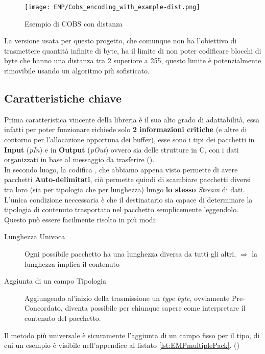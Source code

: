 \begin{figure}[h]
	\centering
	\texttt{[image: EMP/Cobs\_encoding\_with\_example-dist.png]}
	\caption[Esempio di COBS con distanza]{Esempio di COBS con distanza}
\end{figure}

La versione usata per questo progetto, che comunque non ha l'obiettivo di trasmettere quantità infinite di byte, ha il limite di non poter codificare blocchi di byte che hanno una distanza tra 2 \zeroByte superiore a 255, questo limite è potenzialmente rimovibile usando un algoritmo più sofisticato.

\subsection{Caratteristiche chiave}
Prima caratteristica vincente della libreria è il suo alto grado di adattabilità, essa infatti per poter funzionare richiede solo \textbf{2 informazioni critiche} (e altre di contorno per l'allocazione opportuna dei buffer), esse sono i tipi dei pacchetti in \textbf{ Input} (\textit{pIn}) e in \textbf{Output} (\textit{pOut}) ovvero sia delle strutture in C, con i dati organizzati in base al messaggio da trasferire ().\\
In secondo luogo, la codifica , che abbiamo appena visto permette di avere pacchetti \textbf{Auto-delimitati}, ciò permette quindi di scambiare pacchetti diversi tra loro (sia per tipologia che per lunghezza) lungo \textbf{lo stesso} \textit{Stream} di dati.\\
L'unica condizione neccessaria è che il destinatario sia capace di determinare la tipologia di contenuto trasportato nel pacchetto semplicemente leggendolo.\\
Questo può essere facilmente risolto in più modi:
\begin{spacing}{1.5}
	\begin{description}
		\item[Lunghezza Univoca] Ogni possibile pacchetto ha una lunghezza diversa da tutti gli altri, $\Rightarrow$ la lunghezza implica il contenuto
		\item[Aggiunta di un campo Tipologia] Aggiungendo al’inizio della trasmissione un \textit{type byte}, ovviamente Pre-Concordato, diventa possibile per chiunque sapere come interpretare il contenuto del pacchetto.
	\end{description}
\end{spacing}
\noindent
Il metodo più universale è sicuramente l'aggiunta di un campo fisso per il tipo, di cui un esempio è visibile nell'appendice al listato \ref{lst:EMPmultiplePack}. ()

